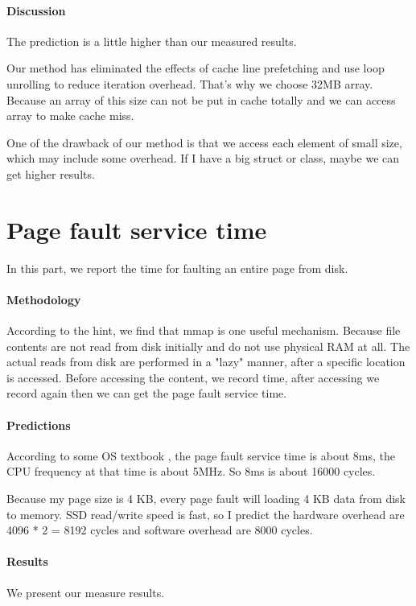 \paragraph{Discussion}
The prediction is a little higher than our measured results. 

Our method has eliminated the effects of cache line prefetching and use loop unrolling to reduce iteration overhead. That's why we choose 32MB array. Because an array of this size can not be put in cache totally and we can access array to make cache miss.

One of the drawback of our method is that we access each element of small size, which may include some overhead. If I have a big struct or class, maybe we can get higher results. 

\section{Page fault service time}
In this part, we report the time for faulting an entire page from disk.

\paragraph{Methodology}
According to the hint, we find that mmap is one useful mechanism. Because file contents are not read from disk initially and do not use physical RAM at all. The actual reads from disk are performed in a "lazy" manner, after a specific location is accessed. Before accessing the content, we record time, after accessing we record again then we can get the page fault service time.

\paragraph{Predictions}
According to some OS textbook \cite{page}, the page fault service time is about 8ms, the CPU frequency at that time is about 5MHz. So 8ms is about 16000 cycles.

Because my page size is 4 KB, every page fault will loading 4 KB data from disk to memory. SSD read/write speed is fast, so I predict the hardware overhead are 4096 * 2 = 8192 cycles and software overhead are 8000 cycles.

\paragraph{Results}
We present our measure results.

